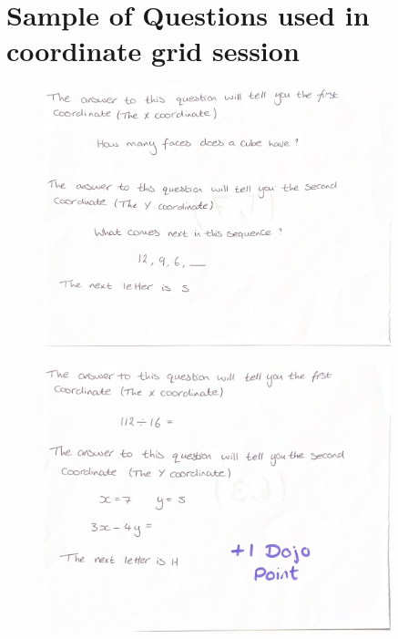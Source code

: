 \documentclass[11pt, a4paper, notitlepage]{article}
\begin{document}
\clearpage

\appendix

\section{Sample of Questions used in coordinate grid session}
\begin{figure}[htbp]
    \centering
    \includegraphics[width=0.9\textwidth]{Images/CoordinateGrid_questions-pages-1.pdf}
\end{figure}
\begin{figure}[htbp]
    \centering
    \includegraphics[width=0.9\textwidth]{Images/CoordinateGrid_questions-pages-2.pdf}
\end{figure}
\end{document}
